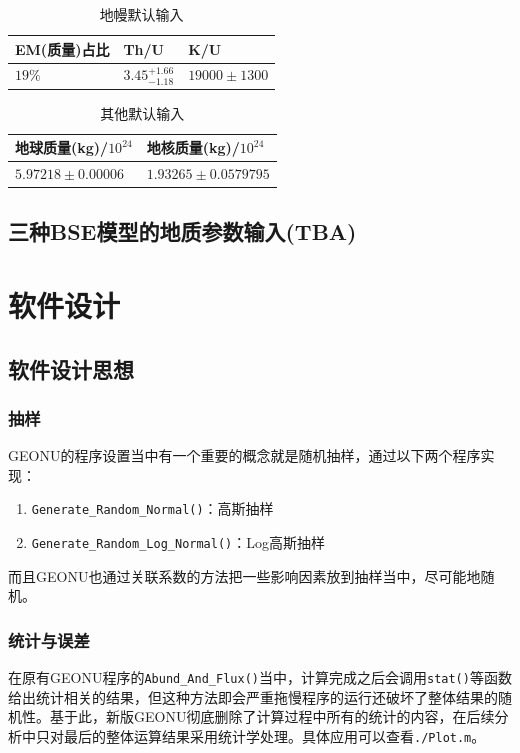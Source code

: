 				\begin{table}[H]
					\centering
					\caption{地幔默认输入}
					\begin{tabular}{p{3cm}p{3cm}p{3cm}}
						\hline
						\hline
						EM(质量)占比 & Th/U & K/U \\
						\hline
						$19\%$ & $3.45^{+1.66}_{-1.18}$ & $19000 \pm 1300$\\
						\hline
						\hline
					\end{tabular}
				\end{table}
				\begin{table}[H]
					\centering
					\caption{其他默认输入}
					\begin{tabular}{p{4cm}|p{4cm}}
						\hline
						\hline
						地球质量(kg)/$10^{24}$ & 地核质量(kg)/$10^{24}$\\
						\hline
						$5.97218 \pm 0.00006 $ & $ 1.93265 \pm 0.0579795$\\
						\hline
						\hline
					\end{tabular}
					\label{Table: Other Default Geology Input}
				\end{table}
		\section{三种BSE模型的地质参数输入(TBA)}
	\chapter{软件设计}
		\section{软件设计思想}
			\subsection{抽样}
				GEONU的程序设置当中有一个重要的概念就是随机抽样，通过以下两个程序实现：
					\begin{enumerate}
						\item \texttt{Generate\_Random\_Normal()}：高斯抽样
						\item \texttt{Generate\_Random\_Log\_Normal()}：Log高斯抽样
					\end{enumerate}
				而且GEONU也通过关联系数的方法把一些影响因素放到抽样当中，尽可能地随机。
			\subsection{统计与误差}
				在原有GEONU程序的\texttt{Abund\_And\_Flux()}当中，计算完成之后会调用\texttt{stat()}等函数给出统计相关的结果，但这种方法即会严重拖慢程序的运行还破坏了整体结果的随机性。基于此，新版GEONU彻底删除了计算过程中所有的统计的内容，在后续分析中只对最后的整体运算结果采用统计学处理。具体应用可以查看\texttt{./Plot.m}。
